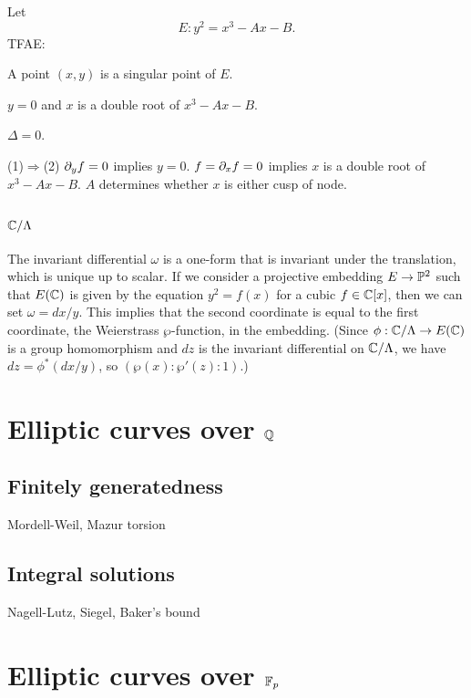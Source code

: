 \documentclass{../../large}
\begin{document}
\begin{thm}
Let
\[E:y^2=x^3-Ax-B.\]
TFAE:
\begin{parts}
\item A point $(x,y)$ is a singular point of $E$.
\item $y=0$ and $x$ is a double root of $x^3-Ax-B$.
\item $\Delta=0$.
\end{parts}
\end{thm}
\begin{pf}
(1)$\Rightarrow$(2)
$\pd_yf=0$ implies $y=0$. $f=\pd_xf=0$ implies $x$ is a double root of $x^3-Ax-B$.
$A$ determines whether $x$ is either cusp of node.
\end{pf}





\section{$\C/\Lambda$}

\begin{prb}
The invariant differential $\omega$ is a one-form that is invariant under the translation, which is unique up to scalar.
If we consider a projective embedding $E\to\P^2$ such that $E(\C)$ is given by the equation $y^2=f(x)$ for a cubic $f\in\C[x]$, then we can set $\omega=dx/y$.
This implies that the second coordinate is equal to the first coordinate, the Weierstrass $\wp$-function, in the embedding. (Since $\phi:\C/\Lambda\to E(\C)$ is a group homomorphism and $dz$ is the invariant differential on $\C/\Lambda$, we have $dz=\phi^*(dx/y)$, so $(\wp(x):\wp'(z):1)$.)
\end{prb}










\chapter{Elliptic curves over $\Q$}
\section{Finitely generatedness}
Mordell-Weil, Mazur torsion
\section{Integral solutions}
Nagell-Lutz, Siegel, Baker's bound
\chapter{Elliptic curves over $\F_p$}
\end{document}

